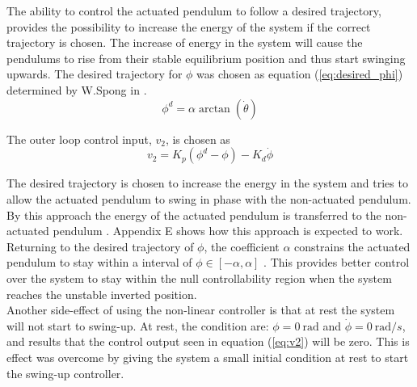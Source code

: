 The ability to control the actuated pendulum to follow a desired trajectory, provides the possibility to increase the energy of the system if the correct trajectory is chosen. The increase of energy in the system will cause the pendulums to rise from their stable equilibrium position and thus start swinging upwards. The desired trajectory for ${\phi}$ was chosen as equation (\ref{eq:desired_phi}) determined by W.Spong in \citep{spong_swingup}.
\begin{equation} \label{eq:desired_phi}
\phi^{d} =  \alpha \arctan(\dot{\theta})
\end{equation}

The outer loop control input, $v_{2}$, is chosen as 
\begin{equation} \label{eq:v2}
v_{2} = K_{p}(\phi^{d}-\phi)-K_{d}\dot{\phi}
\end{equation}

The desired trajectory is chosen to increase the energy in the system and tries to allow the actuated pendulum to swing in phase with the non-actuated pendulum. By this approach the energy of the actuated pendulum is transferred to the non-actuated pendulum \cite{spong_swingup}. Appendix E shows how this approach is expected to work.\\

Returning to the desired trajectory of $\phi$, the coefficient $\alpha$ constrains the actuated pendulum to stay within a interval of $ \phi \in [-\alpha,\alpha] $ \cite{spong_swingup}. This provides better control over the system to stay within the null controllability region when the system reaches the unstable inverted position.\\

Another side-effect of using the non-linear controller is that at rest the system will not start to swing-up. At rest, the condition are: $\phi = \SI{0}{\radian}$ and $\dot{\phi} = \SI{0}{\radian/s}$, and results that the control output seen in equation (\ref{eq:v2}) will be zero. This is effect was overcome by giving the system a small initial condition at rest to start the swing-up controller.



